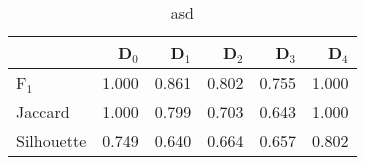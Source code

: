 \begin{table}
\centering
\caption{asd}
\label{tab:s1-cont-eca-single}
\begin{tabular}{lrrrrr}
\toprule
{} &  D$_0$ &  D$_1$ &  D$_2$ &  D$_3$ &  D$_4$ \\
\midrule
F$_1$      &  1.000 &  0.861 &  0.802 &  0.755 &  1.000 \\
Jaccard    &  1.000 &  0.799 &  0.703 &  0.643 &  1.000 \\
Silhouette &  0.749 &  0.640 &  0.664 &  0.657 &  0.802 \\
\bottomrule
\end{tabular}
\end{table}
